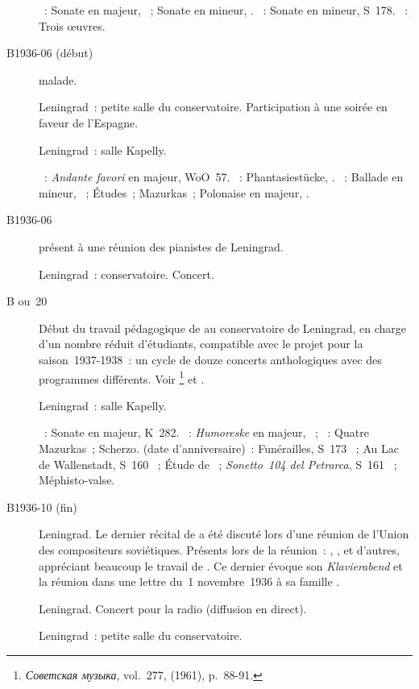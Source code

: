 \begin{description}
 \textsc{\Beethoven{}}~: Sonate en \kD majeur, ~; Sonate en \kF
 mineur, .
 \textsc{\Liszt{}}~: Sonate en \kB mineur, S~178.
 \textsc{\Debussy{}}~: Trois œuvres.
 \item[B1936-06 (début)]
 \VSofronitsky{} malade.
 \item[\DateWithWeekDay{1936-06-15}]
 Leningrad~: petite salle du conservatoire.
 Participation à une soirée en faveur de l'\hbox{Espagne}.
 \item[\DateWithWeekDay{1936-06-26}]
 Leningrad~: salle Kapelly.

 \textsc{\Beethoven{}}~: \emph{Andante favori} en \kF majeur, WoO~57.
 \textsc{\Schumann{}}~: Phantasiestücke, .
 \textsc{\Chopin{}}~: Ballade en \kF mineur, ~; Études~; Mazurkas~;
 Polonaise en \kA \Flat majeur, .
 \item[B1936-06]
 \VSofronitsky{} présent à une réunion des pianistes de Leningrad.
 \item[\DateWithWeekDay{1936-10-15}]
 Leningrad~: conservatoire.
 Concert.
 \item[B\DateWithWeekDay{1936-10-15} ou~20]
 Début du travail pédagogique de \VSofronitsky{} au conservatoire de
 Leningrad, en charge d'un nombre réduit d'étudiants, compatible avec le
 projet pour la saison~1937-1938~: un cycle de douze concerts anthologiques
 avec des programmes différents.
 Voir \citet[p.~90-91]{Savshinsky61}%
 \footnote{\foreignlanguage{russian}{\emph{Советская музыка}}, vol.~277,
  (1961), p.~88-91.}
 et \citet[p.~157]{Nekrasova08}.
 \item[\DateWithWeekDay{1936-10-21}]
 Leningrad~: salle Kapelly.

 \textsc{\Mozart{}}~: Sonate en \kE \Flat majeur, K~282.
 \textsc{\Schumann{}}~: \emph{Humoreske} en \kB \Flat majeur, ~;
 \textsc{\Chopin{}}~: Quatre Mazurkas~; Scherzo.
 \textsc{\Liszt{}} (date d'anniversaire)~: Funérailles, S~173 ~;
 Au Lac de Wallenstadt, S~160 ~; Étude de \Paganini{}~;
 \emph{Sonetto~104 del Petrarca}, S~161 ~; Méphisto-valse.
 \item[B1936-10 (fin)]
 Leningrad.
 Le dernier récital de \VSofronitsky{} a été discuté lors d'une réunion de
 l'\hbox{Union} des compositeurs soviétiques.
 Présents lors de la réunion~: \LNikolaiev{}, \NGolubovskaya{}, \IBraudo{}
 et d'autres, appréciant beaucoup le travail de \VSofronitsky{}.
 Ce dernier évoque son \foreignlanguage{german}{\emph{Klavierabend}} et la
 réunion dans une lettre du~1\ier{} novembre~1936 à sa famille
 \citep[p.~16]{Kogan08}.
 \item[\DateWithWeekDay{1936-11-03}]
 Leningrad.
 Concert pour la radio (diffusion en direct).
 \item[\DateWithWeekDay{1936-11-15}]
 Leningrad~: petite salle du conservatoire.


\end{description}
